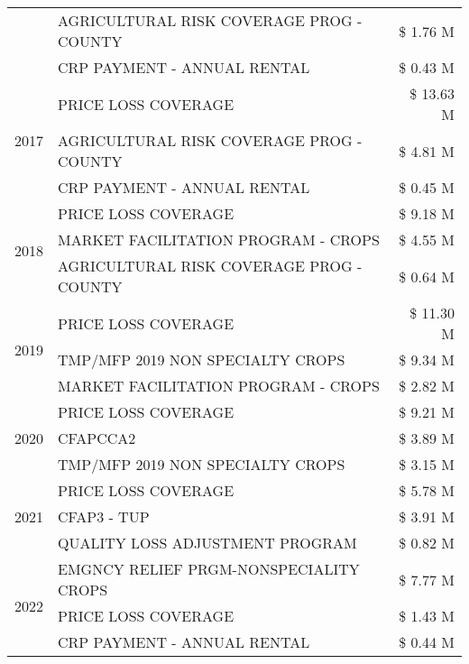 \begin{tabular}{llr}
 & AGRICULTURAL RISK COVERAGE PROG - COUNTY & \$ 1.76 M \\
 & CRP PAYMENT - ANNUAL RENTAL & \$ 0.43 M \\
\cline{1-3}
\multirow[t]{3}{*}{2017} & PRICE LOSS COVERAGE & \$ 13.63 M \\
 & AGRICULTURAL RISK COVERAGE PROG - COUNTY & \$ 4.81 M \\
 & CRP PAYMENT - ANNUAL RENTAL & \$ 0.45 M \\
\cline{1-3}
\multirow[t]{3}{*}{2018} & PRICE LOSS COVERAGE & \$ 9.18 M \\
 & MARKET FACILITATION PROGRAM - CROPS & \$ 4.55 M \\
 & AGRICULTURAL RISK COVERAGE PROG - COUNTY & \$ 0.64 M \\
\cline{1-3}
\multirow[t]{3}{*}{2019} & PRICE LOSS COVERAGE & \$ 11.30 M \\
 & TMP/MFP 2019 NON SPECIALTY CROPS & \$ 9.34 M \\
 & MARKET FACILITATION PROGRAM - CROPS & \$ 2.82 M \\
\cline{1-3}
\multirow[t]{3}{*}{2020} & PRICE LOSS COVERAGE & \$ 9.21 M \\
 & CFAPCCA2 & \$ 3.89 M \\
 & TMP/MFP 2019 NON SPECIALTY CROPS & \$ 3.15 M \\
\cline{1-3}
\multirow[t]{3}{*}{2021} & PRICE LOSS COVERAGE & \$ 5.78 M \\
 & CFAP3 - TUP & \$ 3.91 M \\
 & QUALITY LOSS ADJUSTMENT PROGRAM & \$ 0.82 M \\
\cline{1-3}
\multirow[t]{3}{*}{2022} & EMGNCY RELIEF PRGM-NONSPECIALITY CROPS & \$ 7.77 M \\
 & PRICE LOSS COVERAGE & \$ 1.43 M \\
 & CRP PAYMENT - ANNUAL RENTAL & \$ 0.44 M \\
\cline{1-3}
\bottomrule
\end{tabular}
